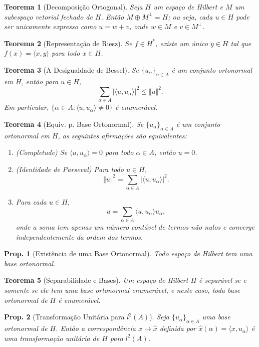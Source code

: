 \documentclass[11pt]{article}
\theoremstyle{yellowhead}
\newtheorem*{theorem}{Teorema}
\newtheorem*{proposition}{Prop.}
\theoremstyle{yellowdef}
\begin{document}
\begin{multicols}{3}
\begin{theorem}[Decomposição Ortogonal]
Seja $H$ um espaço de Hilbert e $M$ um subespaço vetorial fechado de $H$. Então $M \oplus M^\perp = H$; ou seja, cada $u \in H$ pode ser unicamente expresso como $u = w + v$, onde $w \in M$ e $v \in M^\perp$.
\end{theorem}

\begin{theorem}[Representação de Riesz]
Se $f \in H^*$, existe um único $y \in H$ tal que $f(x) = \langle x, y \rangle$ para todo $x \in H$.
\end{theorem}

\begin{theorem}[A Desigualdade de Bessel]
Se $\{u_\alpha\}_{\alpha \in A}$ é um conjunto ortonormal em $H$, então para $u \in H$,
\[
\sum_{\alpha \in A} |\langle u, u_\alpha \rangle|^2 \le \Vert u \Vert^2.
\]
Em particular, $\{\alpha \in A : \langle u, u_\alpha \rangle \neq 0\}$ é enumerável.
\end{theorem}

\begin{theorem}[Equiv. p. Base Ortonormal]
Se $\{u_\alpha\}_{\alpha \in A}$ é um conjunto ortonormal em $H$, as seguintes afirmações são equivalentes:
\begin{enumerate}[label=(\alph*)]
    \item (Completude) Se $\langle u, u_\alpha \rangle = 0$ para todo $\alpha \in A$, então $u = 0$.
    \item (Identidade de Parseval) Para todo $u \in H$,
    \[
    \Vert u \Vert^2 = \sum_{\alpha \in A} |\langle u, u_\alpha \rangle|^2.
    \]
    \item Para cada $u \in H$,
    \[
    u = \sum_{\alpha \in A} \langle u, u_\alpha \rangle u_\alpha,
    \]
    onde a soma tem apenas um número contável de termos não nulos e converge independentemente da ordem dos termos.
\end{enumerate}
\end{theorem}

\begin{proposition}[Existência de uma Base Ortonormal]
Todo espaço de Hilbert tem uma base ortonormal.
\end{proposition}

\begin{theorem}[Separabilidade e Bases]
Um espaço de Hilbert $H$ é separável se e somente se ele tem uma base ortonormal enumerável, e neste caso, toda base ortonormal de $H$ é enumerável.
\end{theorem}

\begin{proposition}[Transformação Unitária para $l^2(A)$]
Seja $\{u_\alpha\}_{\alpha \in A}$ uma base ortonormal de $H$. Então a correspondência $x \to \hat{x}$ definida por $\hat{x}(\alpha) = \langle x, u_\alpha \rangle$ é uma transformação unitária de $H$ para $l^2(A)$.
\end{proposition}
\end{multicols}
\end{document}
